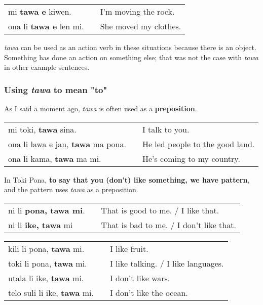 \begin{supertabular}{p{5,5cm}|ll}
mi \textbf{tawa e} kiwen. && I'm moving the rock. \\
ona li \textbf{tawa e} len mi. && She moved my clothes. \\
\end{supertabular} 

\textit{tawa} can be used as an action verb in these situations because there is an object. 
Something has done an action on something else; that was not the case with \textit{tawa} in other example sentences. 

%
\subsubsection*{Using \textit{tawa} to mean "to"}
%
As I said a moment ago, \textit{tawa} is often used as a \textbf{preposition}. 

\begin{supertabular}{p{5,5cm}|ll}
mi toki, \textbf{tawa} sina. && I talk to you. \\
ona li lawa e jan, \textbf{tawa} ma pona. && He led people to the good land. \\
ona li kama, \textbf{tawa} ma mi. && He's coming to my country. \\
\end{supertabular} 

In Toki Pona, \textbf{to say that you (don't) like something, we have pattern}, and the pattern uses \textit{tawa} as a preposition.

\begin{supertabular}{p{5,5cm}|ll}
ni li \textbf{pona, tawa mi}. && That is good to me. / I like that. \\
ni li \textbf{ike, tawa} mi && That is bad to me. / I don't like that. \\
\end{supertabular} 

\begin{supertabular}{p{5,5cm}|ll}
kili li pona, \textbf{tawa} mi. && I like fruit. \\
toki li pona, \textbf{tawa} mi. && I like talking. / I like languages. \\
utala li ike, \textbf{tawa} mi. && I don't like wars. \\
telo suli li ike, \textbf{tawa} mi. && I don't like the ocean. \\
\end{supertabular} 

